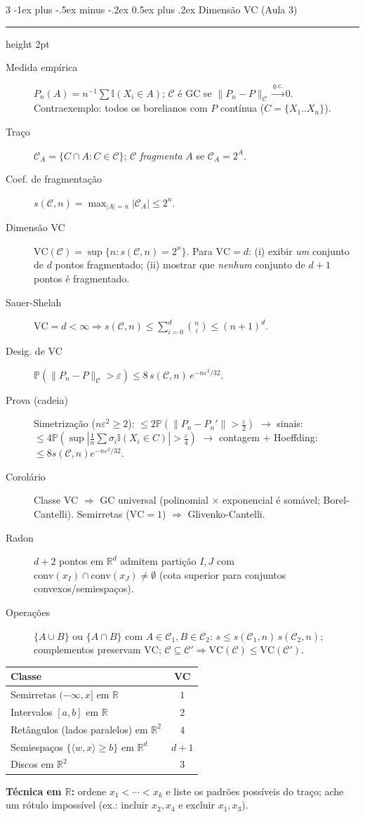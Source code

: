 \documentclass[10pt,landscape]{article}
\makeatletter
\renewcommand{\P}{\mathbb{P}}
\newcommand{\I}{\mathbb{I}}
\newcommand{\R}{\mathbb{R}}
\newcommand{\VC}{\textrm{VC}}
\newcommand{\qc}{\xrightarrow{q.c.}}
\renewcommand{\section}{\@startsection{section}{1}{0mm}%
                                {-1ex plus -.5ex minus -.2ex}%
                                {0.5ex plus .2ex}%
                                {\normalfont\small\bfseries}}
\newcommand{\secrule}{\smallskip \hrule height 2pt \smallskip}
\makeatother
\begin{document}
\begin{multicols}{3}
\section{Dimensão VC (Aula 3)}\secrule
\begin{description}
  \item[Medida empírica] $P_n(A)=n^{-1}\sum\I(X_i\in A)$; $\mathcal C$ é GC se $\|P_n-P\|_{\mathcal C}\qc0$. Contraexemplo: todos os borelianos com $P$ contínua ($C=\{X_1..X_n\}$).
  \item[Traço] $\mathcal C_A=\{C\cap A:C\in\mathcal C\}$; $\mathcal C$ \emph{fragmenta} $A$ se $\mathcal C_A=2^A$.
  \item[Coef. de fragmentação] $s(\mathcal C,n)=\max_{|A|=n}|\mathcal C_A|\le2^n$.
  \item[Dimensão VC] $\VC(\mathcal C)=\sup\{n:s(\mathcal C,n)=2^n\}$. Para $\VC=d$: (i) exibir \emph{um} conjunto de $d$ pontos fragmentado; (ii) mostrar que \emph{nenhum} conjunto de $d+1$ pontos é fragmentado.
  \item[Sauer-Shelah] $\VC=d<\infty\Rightarrow s(\mathcal C,n)\le\sum_{i=0}^d\binom ni\le(n+1)^d$.
  \item[Desig. de VC] $\P(\|P_n-P\|_{\mathcal C}>\varepsilon)\le8\,s(\mathcal C,n)\,e^{-n\varepsilon^2/32}$.
  \item[Prova (cadeia)] Simetrização ($n\varepsilon^2\ge2$): $\le2\P(\|P_n-P_n'\|>\frac\varepsilon2)$ $\to$ sinais: $\le4\P(\sup|\frac1n\sum\sigma_i\I(X_i\in C)|>\frac\varepsilon4)$ $\to$ contagem $+$ Hoeffding: $\le8s(\mathcal C,n)e^{-n\varepsilon^2/32}$.
  \item[Corolário] Classe VC $\Rightarrow$ GC universal (polinomial $\times$ exponencial é somável; Borel-Cantelli). Semirretas ($\VC=1$) $\Rightarrow$ Glivenko-Cantelli.
  \item[Radon] $d+2$ pontos em $\R^d$ admitem partição $I,J$ com $\textrm{conv}(x_I)\cap\textrm{conv}(x_J)\ne\emptyset$ (cota superior para conjuntos convexos/semiespaços).
  \item[Operações] $\{A\cup B\}$ ou $\{A\cap B\}$ com $A\in\mathcal C_1,B\in\mathcal C_2$: $s\le s(\mathcal C_1,n)\,s(\mathcal C_2,n)$; complementos preservam $\VC$; $\mathcal C\subseteq\mathcal C'\Rightarrow\VC(\mathcal C)\le\VC(\mathcal C')$.
\end{description}
\begin{center}
\begin{tabular}{lc}
\toprule
Classe & VC \\
\midrule
Semirretas $(-\infty,x]$ em $\R$ & $1$ \\
Intervalos $[a,b]$ em $\R$ & $2$ \\
Retângulos (lados paralelos) em $\R^2$ & $4$ \\
Semiespaços $\{\langle w,x\rangle\ge b\}$ em $\R^d$ & $d+1$ \\
Discos em $\R^2$ & $3$ \\
\bottomrule
\end{tabular}
\end{center}
\textbf{Técnica em $\R$:} ordene $x_1<\cdots<x_k$ e liste os padrões possíveis do traço; ache um rótulo impossível (ex.: incluir $x_2,x_4$ e excluir $x_1,x_3$).


\end{multicols}
\end{document}
